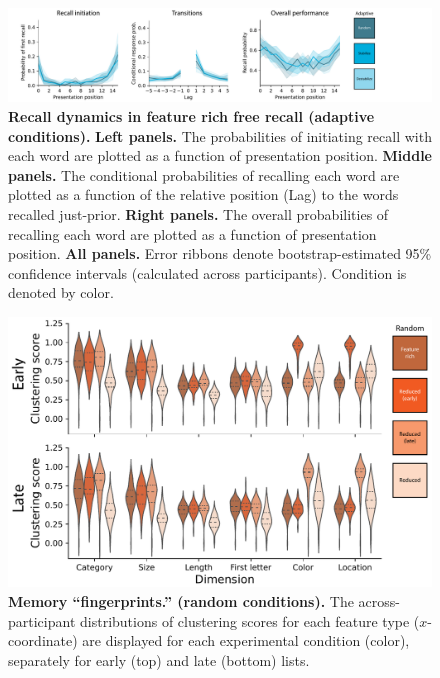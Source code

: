 \documentclass{article}
\begin{document}
\begin{figure}[p] \centering
    \includegraphics[width=\textwidth]{figures/recall_dynamics_adaptive}
    
    \caption{\textbf{Recall dynamics in feature rich free recall (adaptive conditions).} \textbf{Left panels.} The probabilities of
    initiating recall with each word are plotted as a function of presentation
    position. \textbf{Middle panels.} The conditional probabilities of recalling
    each word are plotted as a function of the relative position (Lag) to the words
    recalled just-prior. \textbf{Right panels.} The overall probabilities of
    recalling each word are plotted as a function of presentation position.
    \textbf{All panels.} Error ribbons denote bootstrap-estimated 95\% confidence
    intervals (calculated across participants). Condition is denoted by color.}
    
        \label{fig:recall-dynamics-adaptive}
    \end{figure}

\begin{figure}[tp] \centering
    \includegraphics[width=\textwidth]{figures/fingerprints_random}
    
    \caption{\textbf{Memory ``fingerprints.'' (random conditions).}
    The across-participant distributions of clustering scores for each feature
    type ($x$-coordinate) are displayed for each experimental condition
    (color), separately for early (top) and late (bottom) lists.}
        \label{fig:fingerprints-random}
\end{figure}
    
\end{document}
